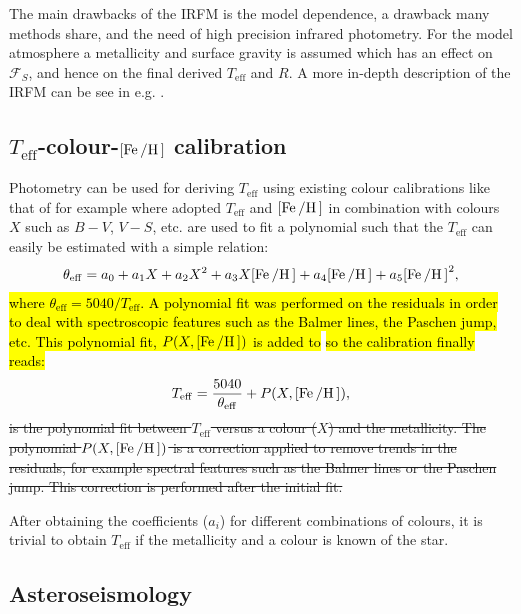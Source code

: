 The main drawbacks of the IRFM is the model dependence, a drawback many methods share, and the need
of high precision infrared photometry. For the model atmosphere a metallicity and surface gravity is
assumed which has an effect on $\mathcal{F}_S$, and hence on the final derived $T_\mathrm{eff}$ and
$R$. A more in-depth description of the IRFM can be see in e.g. \citet[][section 4]{Casagrande2006}.


\subsection{\texorpdfstring{$T_\mathrm{eff}$}{Teff}-colour-\texorpdfstring{$[\ion{Fe}/\ion{H}]$}{[Fe/H]} calibration}

Photometry can be used for deriving $T_\mathrm{eff}$ using existing colour calibrations like that of
for example \citet{Ramirez2005a} where adopted $T_\mathrm{eff}$ and $[\ion{Fe}/\ion{H}]$ in
combination with colours $X$ such as $B-V$, $V-S$, etc. are used to fit a polynomial such that the
$T_\mathrm{eff}$ can easily be estimated with a simple relation:
\begin{align}
  \theta_\mathrm{eff} = a_0+a_1 X+a_2 X^2+a_3X[\ion{Fe}/\ion{H}] + a_4[\ion{Fe}/\ion{H}] + a_5[\ion{Fe}/\ion{H}]^2, \label{eq:irfm}
\end{align}
\hl{where $\theta_\mathrm{eff}=5040/T_\mathrm{eff}$. A polynomial fit was performed on the residuals
in order to deal with spectroscopic features such as the Balmer lines, the Paschen jump, etc. This
polynomial fit, $P(X, [\ion{Fe}/\ion{H}])$ is added to}  \hl{so the calibration
finally reads:}
\begin{align}
  T_\mathrm{eff} = \frac{5040}{\theta_\mathrm{eff}} + P(X, [\ion{Fe}/\ion{H}]),
\end{align}
\st{is the polynomial fit between $T_\mathrm{eff}$ versus a colour ($X$) and the metallicity. The
polynomial $P(X, [\ion{Fe}/\ion{H}])$ is a correction applied to remove trends in the residuals, for
example spectral features such as the Balmer lines or the Paschen jump. This correction is performed
after the initial fit.}

After obtaining the coefficients ($a_i$) for different combinations of colours, it is trivial to
obtain $T_\mathrm{eff}$ if the metallicity and a colour is known of the star.

\subsection{Asteroseismology}
\label{sec:asteroseismology}

